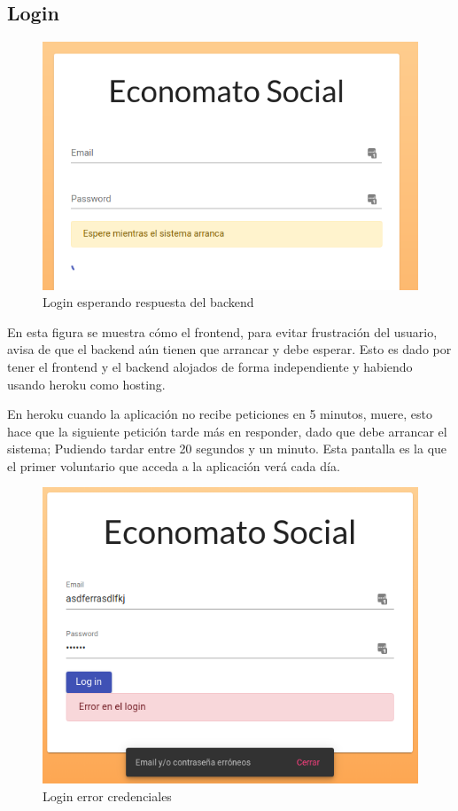 \subsection{Login}
\begin{figure}[h]
\centering
\includegraphics[scale=0.7]{archivos/login-esperando-backend.png}
\caption{Login esperando respuesta del backend}
\label{fig:login_esperando_backend}
\end{figure}
\vspace{1em}
\par En esta figura se muestra cómo el frontend, para evitar frustración del usuario, avisa de que el backend aún tienen que arrancar y debe esperar. Esto es dado por tener el frontend y el backend alojados de forma independiente y habiendo usando heroku como hosting.
\vspace{1em}
\par En heroku cuando la aplicación no recibe peticiones en 5 minutos, muere, esto hace que la siguiente petición tarde más en responder, dado que debe arrancar el sistema; Pudiendo tardar entre 20 segundos y un minuto. Esta pantalla es la que el primer voluntario que acceda a la aplicación verá cada día.
\clearpage
\begin{figure}[h]
\centering
\includegraphics[scale=0.7]{archivos/login-credenciales-incorrectas.png}
\caption{Login error credenciales}
\label{fig:login_error_credenciales}
\end{figure}
